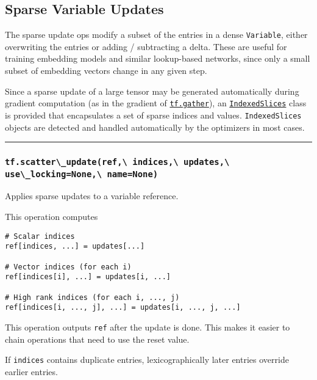 \subsection{Sparse Variable Updates }\label{sparse-variable-updates}

The sparse update ops modify a subset of the entries in a dense
\lstinline{Variable}, either overwriting the entries or adding /
subtracting a delta. These are useful for training embedding models and
similar lookup-based networks, since only a small subset of embedding
vectors change in any given step.

Since a sparse update of a large tensor may be generated automatically
during gradient computation (as in the gradient of
\href{../../api_docs/python/array_ops.md\#gather}{\lstinline{tf.gather}}),
an \protect\hyperlink{IndexedSlices}{\lstinline{IndexedSlices}} class is
provided that encapsulates a set of sparse indices and values.
\lstinline{IndexedSlices} objects are detected and handled automatically by
the optimizers in most cases.

\begin{center}\rule{0.5\linewidth}{\linethickness}\end{center}

\subsubsection{\texorpdfstring{\lstinline{tf.scatter\_update(ref,\ indices,\ updates,\ use\_locking=None,\ name=None)}
}{tf.scatter\_update(ref, indices, updates, use\_locking=None, name=None) }}\label{tf.scatterux5fupdateref-indices-updates-useux5flockingnone-namenone}

Applies sparse updates to a variable reference.

This operation computes

\begin{verbatim}
# Scalar indices
ref[indices, ...] = updates[...]

# Vector indices (for each i)
ref[indices[i], ...] = updates[i, ...]

# High rank indices (for each i, ..., j)
ref[indices[i, ..., j], ...] = updates[i, ..., j, ...]
\end{verbatim}

This operation outputs \lstinline{ref} after the update is done. This makes
it easier to chain operations that need to use the reset value.

If \lstinline{indices} contains duplicate entries, lexicographically later
entries override earlier entries.

